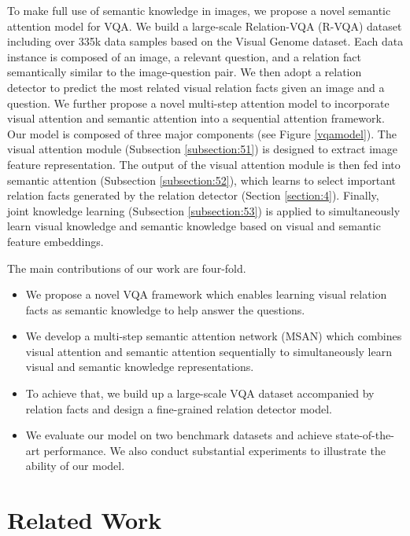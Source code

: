 \documentclass[sigconf]{acmart}
\begin{document}
To make full use of  semantic knowledge in images, we propose a novel semantic attention model for VQA. We build a large-scale Relation-VQA (R-VQA) dataset including over 335k data samples based on the Visual Genome dataset. Each data instance is composed of an image, a relevant question, and a relation fact semantically similar to the image-question pair. We then adopt a relation detector to predict the most related visual relation facts given an image and a question. We further propose a novel multi-step attention model to incorporate visual attention and semantic attention into a sequential attention framework. 
Our model is composed of three major components (see Figure \ref{vqamodel}). 
The visual attention module (Subsection \ref{subsection:51}) is designed to extract image feature representation. The output of the visual attention module is then fed into semantic attention (Subsection \ref{subsection:52}), which learns to select important relation facts generated by the relation detector (Section \ref{section:4}). Finally, joint knowledge learning (Subsection \ref{subsection:53}) is applied to simultaneously learn visual knowledge and semantic knowledge based on visual and semantic feature embeddings.



The main contributions of our work are four-fold. 
\begin{itemize}
	\item We propose a novel VQA framework which enables  learning visual relation facts as semantic knowledge to help answer the questions.   
	\item We develop a multi-step semantic attention network (MSAN) which combines visual attention and semantic attention sequentially to simultaneously learn visual and semantic knowledge representations.
	\item To achieve that, we build up a large-scale VQA dataset accompanied by relation facts and design a fine-grained relation detector model.
	\item We evaluate our model on two benchmark datasets and achieve state-of-the-art performance. We also conduct substantial experiments to illustrate the ability of our model.
\end{itemize}





\section{Related Work}
\end{document}
